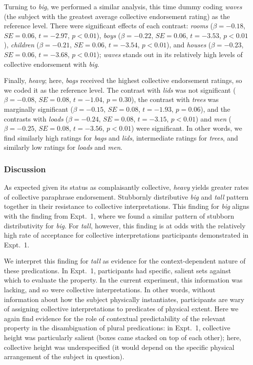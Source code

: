 \documentclass[linguex]{sp}
\begin{document}
Turning to \emph{big}, we performed a similar analysis, this time dummy coding \emph{waves} (the subject with the greatest average collective endorsement rating) as the reference level. There were significant effects of each contrast: \emph{rooms} ($\beta=-0.18$, $SE=0.06$, $t=-2.97$, $p<0.01$), \emph{boys} ($\beta=-0.22$, $SE=0.06$, $t=-3.53$, $p<0.01$), \emph{children} ($\beta=-0.21$, $SE=0.06$, $t=-3.54$, $p<0.01$), and \emph{houses} ($\beta=-0.23$, $SE=0.06$, $t=-3.68$, $p<0.01$); \emph{waves} stands out in its relatively high levels of collective endorsement with \emph{big}.

Finally, \emph{heavy}; here, \emph{bags} received the highest collective endorsement ratings, so we coded it as the reference level. The contrast with \emph{lids} was not significant ($\beta=-0.08$, $SE=0.08$, $t=-1.04$, $p=0.30$), the contrast with \emph{trees} was marginally significant ($\beta=-0.15$, $SE=0.08$, $t=-1.93$, $p=0.06$), and the contrasts with \emph{loads} ($\beta=-0.24$, $SE=0.08$, $t=-3.15$, $p<0.01$) and \emph{men} ($\beta=-0.25$, $SE=0.08$, $t=-3.56$, $p<0.01$) were significant. In other words, we find similarly high ratings for \emph{bags} and \emph{lids}, intermediate ratings for \emph{trees}, and similarly low ratings for \emph{loads} and \emph{men}.

\subsubsection{Discussion}

As expected given its status as complaisantly collective, \emph{heavy} yields greater rates of collective paraphrase endorsement. Stubbornly distributive \emph{big} and \emph{tall} pattern together in their resistance to collective interpretations. This finding for \emph{big} aligns with the finding from Expt.~1, where we found a  similar pattern of stubborn distributivity for \emph{big}. For \emph{tall}, however, this finding is at odds with the relatively high rate of acceptance for collective interpretations participants demonstrated in Expt.~1.

We interpret this finding for \emph{tall} as evidence for the context-dependent nature of these predications. In Expt.~1, participants had specific, salient sets against which to evaluate the property. In the current experiment, this information was lacking, and so were collective interpretations. In other words, without information about how the subject physically instantiates, participants are wary of assigning collective interpretations to predicates of physical extent. Here we again find evidence for the role of contextual predictability of the relevant property in the disambiguation of plural predications: in Expt.~1, collective height was particularly salient (boxes came stacked on top of each other); here, collective height was underspecified (it would depend on the specific physical arrangement of the subject in question).
\end{document}

